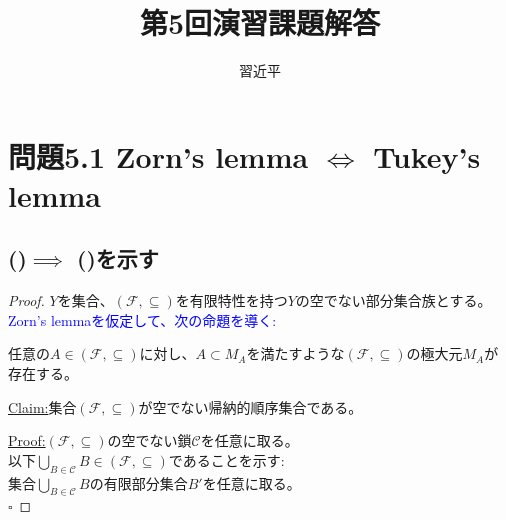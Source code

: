 \documentclass{jreport}
\newenvironment{claim}[1]{\par\noindent\underline{Claim:}\space#1}{}
\newenvironment{claimproof}[1]{\par\noindent\underline{Proof:}\space#1}{\hfill $\square$}
\begin{document}
\title{第5回演習課題解答}
\author{習近平}
\maketitle
\setcounter{chapter}{5}
\newpage
\tableofcontents
{}
\newpage
\section{問題5.1 Zorn's lemma $\Leftrightarrow$ Tukey's lemma}
\subsection{\texorpdfstring{()}\  $\implies$ \texorpdfstring{()} \ を示す}
\begin{proof}
$Y$を集合、$(\mathcal{F} ,\subseteq )$を有限特性を持つ$Y$の空でない部分集合族とする。\\
\textcolor{blue}{Zorn's lemmaを仮定して、次の命題を導く:}\\
\begin{framed}
	任意の$A \in (\mathcal{F},\subseteq )$に対し、$A \subset M_A$を満たすような$(\mathcal{F},\subseteq )$の極大元$M_A$が存在する。\\
\end{framed}
\begin{claim}
	集合$(\mathcal{F},\subseteq )$が空でない帰納的順序集合である。\\
\end{claim}
\begin{claimproof}
	$(\mathcal{F},\subseteq )$の空でない鎖$\mathcal{C}$を任意に取る。\\
	以下$\bigcup\limits_{B \in \mathcal{C}}B \in (\mathcal{F},\subseteq )$であることを示す:\\
	集合$\bigcup\limits_{B \in \mathcal{C}}B$の有限部分集合$B'$を任意に取る。\\

\end{claimproof}
\end{proof}
\end{document}
